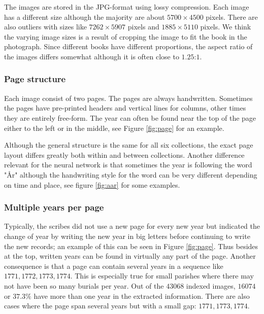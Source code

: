 The images are stored in the JPG-format using lossy compression. Each image has a different size although the majority are about $5700 \times 4500$ pixels. There are also outliers with sizes like $7262 \times 5907$ pixels and $1885 \times 5110$ pixels. We think the varying image sizes is a result of cropping the image to fit the book in the photograph.
Since different books have different proportions, the aspect ratio of the images differs somewhat although it is often close to $1.25$:$1$.

\subsubsection{Page structure}

Each image consist of two pages. The pages are always handwritten. Sometimes the pages have pre-printed headers and vertical lines for columns, other times they are entirely free-form.
The year can often be found near the top of the page either to the left or in the middle, see Figure \ref{fig:page} for an example.



Although the general structure is the same for all six collections, the exact page layout differs greatly both within and between collections. Another difference relevant for the neural network is that sometimes the year is following the word "\r{A}r" although the handwriting style for the word can be very different depending on time and place, see figure \ref{fig:aar} for some examples.


\subsubsection{Multiple years per page}

Typically, the scribes did not use a new page for every new year but indicated the change of year by writing the new year in big letters before continuing to write the new records; an example of this can be seen in Figure \ref{fig:page}.
Thus besides at the top, written years can be found in virtually any part of the page. Another consequence is that a page can contain several years in a sequence like $1771, 1772, 1773, 1774$. This is especially true for small parishes where there may not have been so many burials per year. Out of the $43068$ indexed images, $16074$ or $37.3\%$ have more than one year in the extracted information. There are also cases where the page span several years but with a small gap: $1771, 1773, 1774$.

